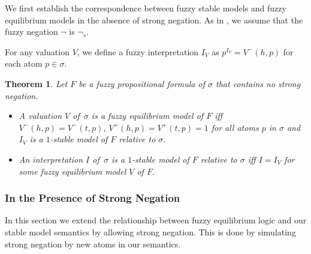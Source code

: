 \documentclass[runningheads]{llncs}
\newtheorem{thm}{Theorem}
\begin{document}

We first establish the correspondence between fuzzy stable models and fuzzy
equilibrium models in the absence of strong negation. 
As in \cite{schockaert12fuzzy}, we assume that the fuzzy negation
$\neg$ is $\neg_{\!s}$. 


For any valuation $V$, we define a fuzzy interpretation $I_V$ as 
$p^{I_V} = V^-(h,p)$ for each atom $p\in\sigma$.


\begin{thm}\label{thm:equil_sm_nostrneg}
Let $F$ be a fuzzy propositional formula of $\sigma$ that contains no
strong negation.
\begin{itemize}
\item[(a)]  A valuation $V$ of~$\sigma$ is a fuzzy equilibrium model
  of $F$ iff $V^-(h,p)=V^-(t,p)$, $V^+(h,p)=V^+(t,p)=1$ for all
  atoms $p$ in $\sigma$ and $I_V$ is a $1$-stable model of $F$ relative to
  $\sigma$. 

\item[(b)] An interpretation $I$ of~$\sigma$ is a $1$-stable model of
  $F$ relative to $\sigma$ iff $I = I_V$ for some fuzzy equilibrium
  model $V$ of $F$. 
\end{itemize}
\end{thm}


\vspace{-3mm}
\subsubsection{In the Presence of Strong Negation}

In this section we extend the relationship between fuzzy equilibrium
logic and our stable model semantics by allowing strong negation. 
This is done by simulating strong negation by new atoms in our
semantics. 
\end{document}
